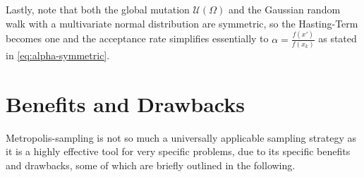 \documentclass[oneside, a4paper]{article}
\newcommand\br[1]{\left(#1\right)}
\begin{document}
Lastly, note that both the global mutation $\mathcal{U}\br{\Omega}$ and the Gaussian random walk with a multivariate normal distribution are symmetric, so the Hasting-Term becomes one and the acceptance rate simplifies essentially to $\alpha=\frac{f(x')}{f(x_k)}$ as stated in \autoref{eq:alpha-symmetric}.



\section{Benefits and Drawbacks}\label{sec:pros-and-cons}

Metropolis-sampling is not so much a universally applicable sampling strategy as it is a highly effective tool for very specific problems, due to its specific benefits and drawbacks, some of which are briefly outlined in the following.
\end{document}
